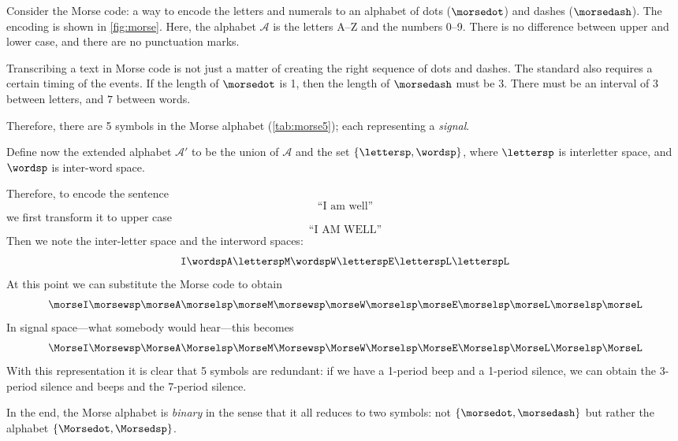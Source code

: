 \begin{example}
  Consider the Morse code: a way to encode the letters and numerals to an alphabet
  of dots ($\morsedot$) and dashes ($\morsedash$). The encoding is shown in \cref{fig:morse}.
  Here, the alphabet $\mathcal{A}$ is the letters A--Z and the numbers 0--9.
  There is no difference between upper and lower case, and there are no punctuation marks.

  Transcribing a text in Morse code is not just a matter of creating the right sequence of dots and dashes.
  The standard also requires a certain timing of the events.
  If the length of $\morsedot$ is 1, then the length of $\morsedash$ must be 3.
  There must be an interval of $3$ between letters, and $7$ between words.

  Therefore, there are 5 symbols in the Morse alphabet (\cref{tab:morse5}); each representing a \emph{signal}.


  Define now the extended alphabet  $\mathcal{A}'$ to be the union of $\mathcal{A}$ and the set $\{\lettersp, \wordsp\}$, where $\lettersp$ is interletter space, and $\wordsp$ is inter-word space.

  Therefore, to encode the sentence
  \begin{equation}
    \text{``I am well''}
  \end{equation}
  we first transform it to upper case
  \begin{equation}
    \text{``I AM WELL''}
  \end{equation}
  Then we note the inter-letter space and the interword spaces:
  \begin{equation}
    \texttt{I} \wordsp \texttt{A} \lettersp \texttt{M} \wordsp \texttt{W} \lettersp
    \texttt{E} \lettersp \texttt{L} \lettersp \texttt{L}
  \end{equation}
  At this point we can substitute the Morse code to obtain
  \begin{equation}
    \morseI \morsewsp \morseA \morselsp \morseM \morsewsp \morseW \morselsp \morseE \morselsp \morseL \morselsp \morseL
  \end{equation}
  In signal space---what somebody would hear---this becomes
  \begin{equation}
    \MorseI \Morsewsp \MorseA \Morselsp \MorseM \Morsewsp \MorseW \Morselsp \MorseE \Morselsp \MorseL \Morselsp \MorseL
  \end{equation}
  With this representation it is clear that 5 symbols are redundant: if we have a 1-period beep and a 1-period silence, we can obtain the 3-period silence and beeps and the 7-period silence.

  In the end, the Morse alphabet is \emph{binary} in the sense that it all reduces to two symbols: not $\{\morsedot, \morsedash\}$ but rather the alphabet $\{\Morsedot, \Morsedsp\}$.
\end{example}

